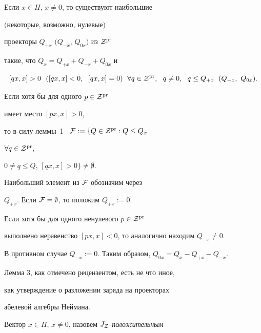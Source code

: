 \begin{lem}


Если $x\in H$, $x\ne 0$, то существуют наибольшие


$($некоторые, возможно, нулевые$)$ 


проекторы $Q_{+x}$ $(Q_{-x}$, $Q_{0x})$ из ${\cal Z}^{\operatorname{pr}}$


такие, что $Q_{x}=Q_{+x}+Q_{-x}+Q_{0x}$ и


$$


[qx,x]>0\ \ ([qx,x]<0,\ \; [qx,x]=0)\ \; \forall q\in {\cal Z}^{\pr},


\ \ q\ne 0,\ \ q\leq Q_{+x}\ \; (Q_{-x},\ Q_{0x}).


$$


\end{lem}





\begin{pf}


Если хотя бы для одного $p\in {\cal Z}^{\operatorname{pr}}$


имеет место $[px,x]>0$,


то в силу леммы~1 \ ${\cal F}:=\{Q\in {\cal Z}^{\operatorname{pr}}:Q\leq Q_{x}$


$\forall q\in {\cal Z}^{\operatorname{pr}}$, 


$0\ne q\leq Q$, $[qx,x]>0\}\ne\emptyset$. 


Наибольший элемент из $\cal F$ обозначим через 


$Q_{+x}$. Если ${\cal F}=\emptyset$, то положим $Q_{+x}:=0$. 





Если хотя бы для одного ненулевого $p\in {\cal Z}^{\operatorname{pr}}$


выполнено неравенство $[px,x]<0$, то аналогично находим $Q_{-x}\ne 0$.


В противном случае $Q_{-x}:=0$. Таким образом, $Q_{0x}=Q_{x}-Q_{+x}-Q_{-x}$.


\end{pf}





Лемма 3, как отмечено рецензентом, есть не что иное,


как утверждение о разложении заряда на проекторах 


абелевой алгебры Неймана.





Вектор $x\in H$, $x\ne 0$, назовем $J_{\cal Z}$-{\it положительным}



